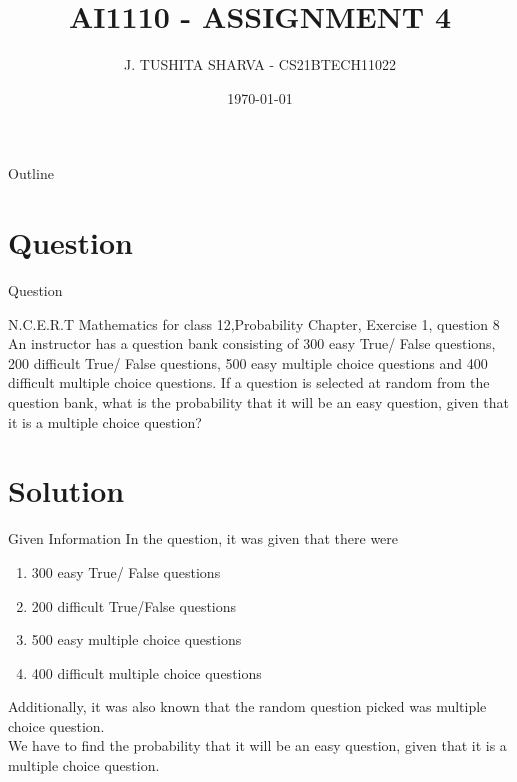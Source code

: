 \documentclass{beamer}
\title{AI1110 - ASSIGNMENT 4}
\author{J. TUSHITA SHARVA - CS21BTECH11022}
\date{\today}
\numberwithin{equation}{subsection}
\begin{document}
\begin{frame}
    \titlepage 
\end{frame}

\logo{}

\begin{frame}{Outline}
    \tableofcontents
\end{frame}




\section{Question}
\begin{frame}{Question}
    \begin{block}{N.C.E.R.T Mathematics for class 12,Probability Chapter, Exercise 1, question 8}
        An instructor has a question bank consisting of
300 easy True/ False questions, 200 difficult True/
False questions, 500 easy multiple choice questions
and 400 difficult multiple choice questions. If a
question is selected at random from the question
bank, what is the probability that it will be an easy
question, given that it is a multiple choice question?
    \end{block}
\end{frame}

\section{Solution}
\begin{frame}{Given Information}
In the question, it was given that there were 
\begin{enumerate}
    \item 300 easy True/ False questions
    \item 200 difficult True/False questions
    \item 500 easy multiple choice questions
    \item 400 difficult multiple choice questions
\end{enumerate}
Additionally, it was also known that the random question picked was multiple choice question.\\
We have to find the probability  that it will be an easy question, given that it is a multiple choice question.
\end{frame}
\end{document}
